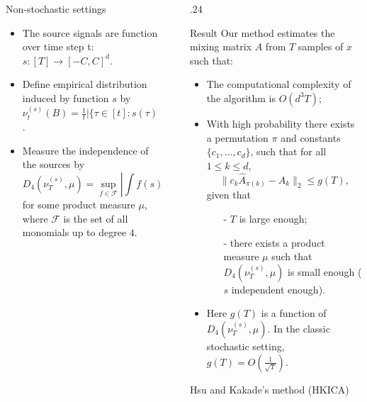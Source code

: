 \documentclass[final]{beamer} %
\begin{document}
\begin{frame}[c]
\begin{columns}[t,totalwidth=\textwidth]
\begin{column}{.24\textwidth}
		\begin{block}{Non-stochastic settings}
			\begin{itemize}
				\item The source signals are function over time step t: $s:[T] \to [-C,C]^d$.
				\item Define empirical distribution induced by function $s$ by $\nu_t^{(s)}(B)=\tfrac{1}{t}|\{\tau \in [t]: s(\tau) \in B\}|$.
				\item Measure the independence of the sources by 
				\[
				D_4(\nu_T^{(s)},\mu) = \sup_{f\in\mathcal{F}} |\int f(s)d\nu_T^{(s)} - \int f(s)d\mu(s)|,
				\]
				for some product measure $\mu$, where $\mathcal{F}$ is the set of all monomials up to degree $4$.
			\end{itemize}
		\end{block}
	\end{column}
	\begin{column}{0.01\textwidth}
	\end{column}
	\begin{column} {.24\textwidth}
		\begin{block}{Result}
			Our method estimates the mixing matrix $A$ from $T$ samples of $x$ such that: 
			\begin{itemize}
				\item The computational complexity of the algorithm is $O(d^3 T)$;
				\item With high probability there exists a permutation $\pi$ and constants $\{c_1,\ldots,c_d\}$, such that for all $1\le k\le d$, 
				\[\| c_k\hat{A}_{\pi(k)} - A_k\|_2 \le g(T),\]
				given that 
				\begin{itemize}
					\item[-]  $T$ is large enough;
					\item[-]  there exists a product measure $\mu$ such that $D_4(\nu_T^{(s)},\mu)$ is small enough ($s$ independent enough).
				\end{itemize}
				\item Here $g(T)$ is a function of $D_4(\nu_T^{(s)},\mu)$. In the classic stochastic setting, $g(T) = O(\frac{1}{\sqrt{T}})$.
			\end{itemize}
		\end{block}
		\vspace{0.5ex}
		\begin{block}{Hsu and Kakade's method (HKICA)}

\end{block}
\end{column}
\end{columns}
\end{frame}
\end{document}

